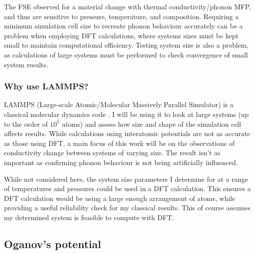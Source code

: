 The FSE observed for a material change with thermal conductivity/phonon MFP, and thus are sensitive to pressure, temperature, and composition. Requiring a minimum simulation cell size to recreate phonon behaviour accurately can be a problem when employing DFT calculations, where systems sizes must be kept small to maintain computational efficiency. Testing system size is also a problem, as calculations of large systems must be performed to check convergence of small system results.

\subsubsection{Why use LAMMPS?}

LAMMPS (Large-scale Atomic/Molecular Massively Parallel Simulator) is a classical molecular dynamics code \citep{Plimpton1995}. I will be using it to look at large systems (up to the order of $10^5$ atoms) and assess how size and shape of the simulation cell affects results. While calculations using interatomic potentials are not as accurate as those using DFT, a main focus of this work will be on the observations of conductivity change between systems of varying size. The \wmks result isn't as important as confirming phonon behaviour is not being artificially influenced. 

While not considered here, the system size parameters I determine for \bdgs at a range of temperatures and pressures could be used in a DFT calculation. This ensures a DFT calculation would be using a large enough arrangement of atoms, while providing a useful reliability check for my classical results. This of course assumes my determined system is feasible to compute with DFT.



\subsection{Oganov's \bdgs potential}

